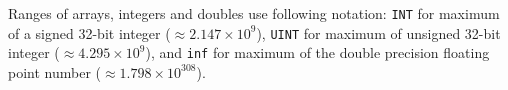 \documentclass[12pt,a4paper]{report}
\begin{document}
Ranges of arrays, integers and doubles use following notation: \verb'INT' for maximum of a signed 32-bit integer ($\approx 2.147\times 10^9$), 
\verb'UINT' for maximum of unsigned 32-bit integer ($\approx 4.295\times 10^9$), and
\verb'inf' for maximum of the double precision floating point number ($\approx1.798\times 10^{308}$). 
\pagebreak




\printindex



\end{document}
